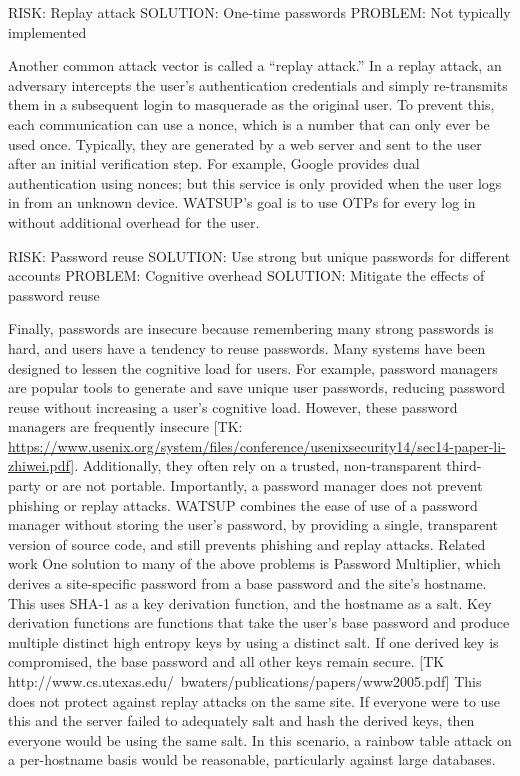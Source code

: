 RISK: Replay attack
SOLUTION: One-time passwords
PROBLEM: Not typically implemented

Another common attack vector is called a “replay attack.” In a replay attack, an adversary intercepts the user's authentication credentials and simply re-transmits them in a subsequent login to masquerade as the original user. To prevent this, each communication can use a nonce, which is a number that can only ever be used once. Typically, they are generated by a web server and sent to the user after an initial verification step. For example, Google provides dual authentication using nonces; but this service is only provided when the user logs in from an unknown device. WATSUP’s goal is to use OTPs for every log in without additional overhead for the user.


RISK: Password reuse
SOLUTION: Use strong but unique passwords for different accounts
PROBLEM: Cognitive overhead
SOLUTION: Mitigate the effects of password reuse

Finally, passwords are insecure because remembering many strong passwords is hard, and users have a tendency to reuse passwords. Many systems have been designed to lessen the cognitive load for users. For example, password managers are popular tools to generate and save unique user passwords, reducing password reuse without increasing a user's cognitive load. However, these password managers are frequently insecure [TK: \url{https://www.usenix.org/system/files/conference/usenixsecurity14/sec14-paper-li-zhiwei.pdf}]. Additionally, they often rely on a trusted, non-transparent third-party or are not portable. Importantly, a password manager does not prevent phishing or replay attacks. WATSUP combines the ease of use of a password manager without storing the user’s password, by providing a single, transparent version of source code, and still prevents phishing and replay attacks.
Related work
One solution to many of the above problems is Password Multiplier, which derives a site-specific password from a base password and the site’s hostname. This uses SHA-1 as a key derivation function, and the hostname as a salt. Key derivation functions are functions that take the user’s base password and produce multiple distinct high entropy keys by using a distinct salt. If one derived key is compromised, the base password and all other keys remain secure. [TK http://www.cs.utexas.edu/~bwaters/publications/papers/www2005.pdf] This does not protect against replay attacks on the same site. If everyone were to use this and the server failed to adequately salt and hash the derived keys, then everyone would be using the same salt. In this scenario, a rainbow table attack on a per-hostname basis would be reasonable, particularly against large databases.

